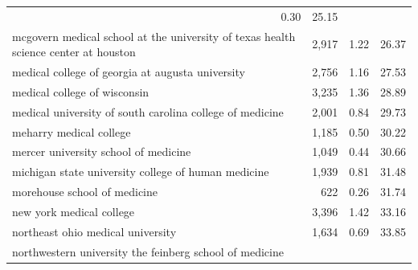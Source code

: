 \begin{table}[!h]
\begin{tabular}{llll}
  \multicolumn{1}{r}{0.30} &
  \multicolumn{1}{r}{25.15} \\
\multicolumn{1}{l}{\hspace{1em}mcgovern medical school at the university of texas health science center at houston} &
  \multicolumn{1}{r}{2,917} &
  \multicolumn{1}{r}{1.22} &
  \multicolumn{1}{r}{26.37} \\
\multicolumn{1}{l}{\hspace{1em}medical college of georgia at augusta university} &
  \multicolumn{1}{r}{2,756} &
  \multicolumn{1}{r}{1.16} &
  \multicolumn{1}{r}{27.53} \\
\multicolumn{1}{l}{\hspace{1em}medical college of wisconsin} &
  \multicolumn{1}{r}{3,235} &
  \multicolumn{1}{r}{1.36} &
  \multicolumn{1}{r}{28.89} \\
\multicolumn{1}{l}{\hspace{1em}medical university of south carolina college of medicine} &
  \multicolumn{1}{r}{2,001} &
  \multicolumn{1}{r}{0.84} &
  \multicolumn{1}{r}{29.73} \\
\multicolumn{1}{l}{\hspace{1em}meharry medical college} &
  \multicolumn{1}{r}{1,185} &
  \multicolumn{1}{r}{0.50} &
  \multicolumn{1}{r}{30.22} \\
\multicolumn{1}{l}{\hspace{1em}mercer university school of medicine} &
  \multicolumn{1}{r}{1,049} &
  \multicolumn{1}{r}{0.44} &
  \multicolumn{1}{r}{30.66} \\
\multicolumn{1}{l}{\hspace{1em}michigan state university college of human medicine} &
  \multicolumn{1}{r}{1,939} &
  \multicolumn{1}{r}{0.81} &
  \multicolumn{1}{r}{31.48} \\
\multicolumn{1}{l}{\hspace{1em}morehouse school of medicine} &
  \multicolumn{1}{r}{622} &
  \multicolumn{1}{r}{0.26} &
  \multicolumn{1}{r}{31.74} \\
\multicolumn{1}{l}{\hspace{1em}new york medical college} &
  \multicolumn{1}{r}{3,396} &
  \multicolumn{1}{r}{1.42} &
  \multicolumn{1}{r}{33.16} \\
\multicolumn{1}{l}{\hspace{1em}northeast ohio medical university} &
  \multicolumn{1}{r}{1,634} &
  \multicolumn{1}{r}{0.69} &
  \multicolumn{1}{r}{33.85} \\
\multicolumn{1}{l}{\hspace{1em}northwestern university the feinberg school of medicine} &

\end{tabular}
\end{table}
